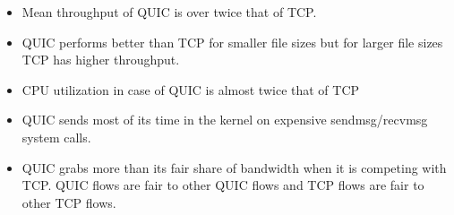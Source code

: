 \begin{frame}
\begin{itemize}
    \itemsep2em
\item Mean throughput of QUIC is over twice that of TCP.

\item QUIC performs better than TCP for smaller file sizes but for larger file sizes TCP has higher throughput.

\item CPU utilization in case of QUIC is almost twice that of TCP%

\item QUIC sends most of its time in the kernel on expensive sendmsg/recvmsg system calls. 

\item QUIC grabs more than its fair share of bandwidth when it is competing with TCP. QUIC flows are fair to other QUIC flows and TCP flows are fair to other TCP flows.%


\end{itemize}
\end{frame}
\clearpage


